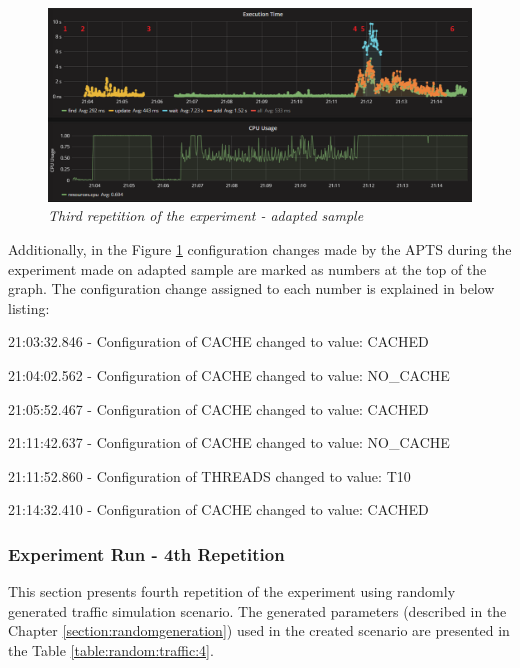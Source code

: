 \documentclass[12pt,a4paper]{article}
\let\tmpone\enumerate
\let\tmptwo\endenumerate
\renewenvironment{enumerate}{\tmpone\addtolength{\itemsep}{-0.4\baselineskip}}{\tmptwo}
\begin{document}
\begin{figure}[!htb]
\centering
\includegraphics[width=1\textwidth]{3-adap}
\caption{\textit{Third repetition of the experiment - adapted sample}} \label{figure:random:screen:adapted:3}
\end{figure}

Additionally, in the Figure \ref{figure:random:screen:adapted:3} configuration changes made by the APTS during the experiment made on adapted sample are marked as numbers at the top of the graph. The configuration change assigned to each number is explained in below listing: 

\begin{enumerate}
\item 21:03:32.846 - Configuration of CACHE changed to value: CACHED
\item 21:04:02.562 - Configuration of CACHE changed to value: NO\_CACHE
\item 21:05:52.467 - Configuration of CACHE changed to value: CACHED
\item 21:11:42.637 - Configuration of CACHE changed to value: NO\_CACHE
\item 21:11:52.860 - Configuration of THREADS changed to value: T10
\item 21:14:32.410 - Configuration of CACHE changed to value: CACHED
\end{enumerate}






\subsubsection{Experiment Run - 4th Repetition}

This section presents fourth repetition of the experiment using randomly generated traffic simulation scenario. The generated parameters (described in the Chapter \ref{section:randomgeneration}) used in the created scenario are presented in the Table \ref{table:random:traffic:4}. 
\end{document}
